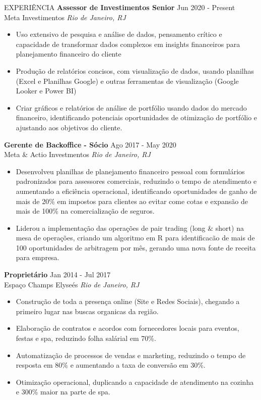 \documentclass{resume}
\begin{document}
\vspace{-1em}
\begin{rSection}{EXPERIÊNCIA}
\textbf{Assessor de Investimentos Senior} \hfill Jun 2020 - Present\\
Meta Investimentos \hfill \textit{Rio de Janeiro, RJ}
{\footnotesize
\begin{itemize}
    \itemsep -3pt {} 
     \item Uso extensivo de pesquisa e análise de dados, pensamento crítico e capacidade de transformar dados complexos em insights financeiros para planejamento financeiro do cliente
     \item Produção de relatórios concisos, com visualização de dados, usando planilhas (Excel e Planilhas Google) e outras ferramentas de visualização (Google Looker e Power BI)
     \item Criar gráficos e relatórios de análise de portfólio usando dados do mercado financeiro, identificando potenciais oportunidades de otimização de portfólio e ajustando aos objetivos do cliente.
 \end{itemize}
}
\textbf{Gerente de Backoffice - Sócio} \hfill Ago 2017 - May 2020\\
Meta \& Actio Investmentos \hfill \textit{Rio de Janeiro, RJ}
{\footnotesize
\begin{itemize}
    \itemsep -3pt {} 
    \item Desenvolveu planilhas de planejamento financeiro pessoal com formulários padronizados para assessores 
    comerciais, reduzindo o tempo de atendimento e aumentando a eficiência operacional, identificando oportunidades 
    de ganho de mais de 20\% em impostos para clientes ao evitar come cotas e expansão de mais de 100\% na comercialização de seguros.
    \item Liderou a implementação das operações de pair trading (long \& short) na mesa de operações, criando 
    um algoritmo em R para identificacão de mais de 100 oportunidades de arbitragem por mês, gerando uma nova 
    fonte de receita para empresa.
\end{itemize}
}
\textbf{Proprietário} \hfill Jan 2014 - Jul 2017\\
Espaço Champs Elyseés \hfill \textit{Rio de Janeiro, RJ}
{\footnotesize
\begin{itemize}
    \itemsep -3pt {} 
    \item Construção de toda a presença online (Site e Redes Sociais), chegando a primeiro lugar nas buscas organicas da região.
    \item Elaboração de contratos e acordos com fornecedores locais para eventos, festas e spa, reduzindo folha salárial em 70\%.
    \item Automatização de processos de vendas e marketing, reduzindo o tempo de resposta em 80\% e aumentando a taxa de conversão em 30\%.
    \item Otimização operacional, duplicando a capacidade de atendimento na cozinha e 300\% maior na parte de spa.
\end{itemize}
}
\end{rSection} 
\end{document}
